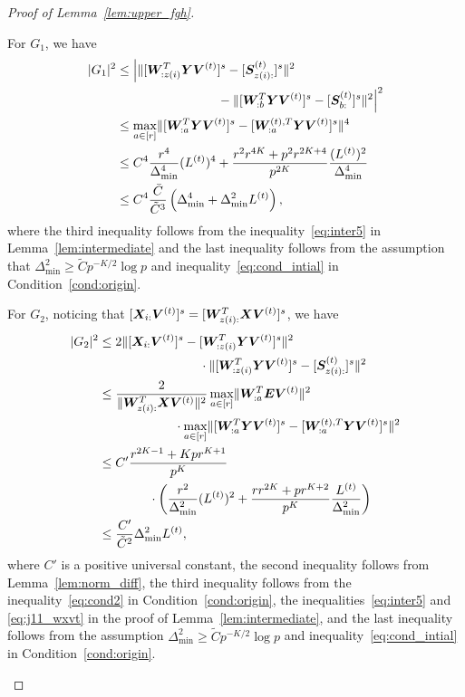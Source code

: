 \documentclass[journal]{IEEEtran}
\theoremstyle{definition}
\theoremstyle{definition}
\newcommand{\of}[1]{\left(#1\right)}
\begin{document}
\begin{proof}[Proof of Lemma~\ref{lem:upper_fgh}]
\begin{enumerate}[wide]
    For $G_1$, we have 
    \begin{align}
        |G_1|^2 &\leq \Big| \onormSize{}{ [ \mW_{:z(i)}^T \mY \mV^{(t)} ]^s - [ \mS_{z(i):}^{(t)}  ]^s}^2 \\
        & \quad \quad \quad \quad \quad  \quad \quad \quad - \onormSize{}{ [ \mW_{:b}^T \mY \mV^{(t)} ]^s -  [ \mS_{b:}^{(t)}  ]^s }^2 \Big|^2 \\
        & \leq \max_{a \in [r]} \onormSize{}{ [ \mW_{:a}^T \mY \mV^{(t)} ]^s - [ \mW_{:a}^{(t),T} \mY \mV^{(t)}  ]^s}^4\\
        & \leq C^4 \frac{r^4}{\Delta_{\min}^4} (L^{(t)})^4 +  \frac{r^2 r^{4K} + p^2r^{2K+4}}{p^{2K}} \frac{(L^{(t)})^2}{\Delta_{\min}^4} \\
        & \leq C^4 \frac{\bar C}{\tilde C^3} \of{\Delta_{\min}^4 +  \Delta_{\min}^2 L^{(t)}}, \label{eq:g1}
    \end{align}
    where the third inequality follows from the inequality~\eqref{eq:inter5} in Lemma~\ref{lem:intermediate} and the last inequality follows from the assumption that $\Delta_{\min}^2 \geq \tilde C p^{-K/2}\log p$ and inequality~\eqref{eq:cond_intial} in Condition~\ref{cond:origin}.
    
    For $G_2$, noticing that $[\bm X_{i:} \bm{V}^{(t)}]^s = [ \bm{W}_{z(i):}^T\bm X \bm{V}^{(t)}]^s$, we have 
    \begin{align}
        |G_2|^2 &\leq 2\onormSize{}{ [\mX_{i:} \mV^{(t)}]^s  -  [  \mW_{:z(i)}^T \mY \mV^{(t)} ]^s}^2 \\
        & \quad \quad \quad \quad \quad  \quad \quad \quad \cdot \onormSize{}{ [  \mW_{:z(i)}^T \mY \mV^{(t)} ]^s -  [  \mS_{z(i):}^{(t)}  ]^s }^2 \\
        & \leq \frac{2}{ \onormSize{}{ \mW_{z(i):}^T\mX \mV^{(t)}}^2} \max_{a \in [r]}\onormSize{}{ \mW_{:a}^T \mE \mV^{(t)} }^2 \\
        & \quad \quad \quad \quad \quad  \quad \cdot \max_{a \in [r]} \onormSize{}{ [  \mW_{:a}^T \mY \mV^{(t)} ]^s -  [   \mW_{:a}^{(t),T} \mY \mV^{(t)}  ]^s}^2\\
        & \leq C' \frac{ r^{2K-1} + K p r^{K+1} }{p^{K}} \\
        &  \quad \quad \quad  \quad  \cdot \of{ \frac{r^2}{\Delta_{\min}^2} (L^{(t)})^2 + \frac{r r^{2K} + pr^{K+2}}{p^{K}} \frac{L^{(t)}}{\Delta_{\min}^2} }\\
        & \leq \frac{C'}{\tilde C^2} \Delta_{\min}^2 L^{(t)},\label{eq:g2}
    \end{align}
    where $C'$ is a positive universal constant, the second inequality follows from Lemma~\ref{lem:norm_diff}, the third inequality follows from the inequality~\eqref{eq:cond2} in Condition~\ref{cond:origin}, the inequalities~\eqref{eq:inter5} and \eqref{eq:j11_wxvt} in the proof of Lemma~\ref{lem:intermediate},  and the last inequality follows from the assumption $\Delta_{\min}^2 \geq \tilde C p^{-K/2} \log p$ and inequality~\eqref{eq:cond_intial} in Condition~\ref{cond:origin}.
    

\end{enumerate}
\end{proof}
\end{document}
